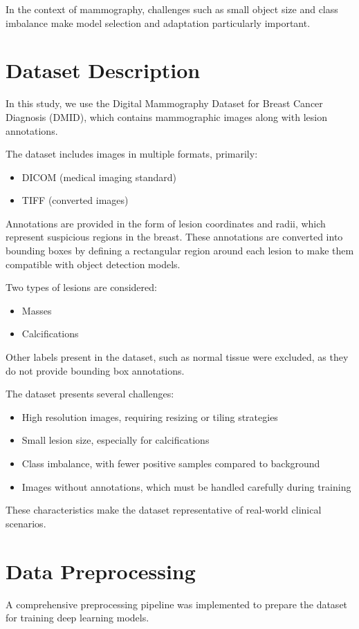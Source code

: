 \documentclass[12pt,a4paper]{article} %
\begin{document}
In the context of mammography, challenges such as small object size and class imbalance make model selection and adaptation particularly important.

\section{Dataset Description}
In this study, we use the Digital Mammography Dataset for Breast Cancer Diagnosis (DMID), which contains mammographic images along with lesion annotations.

The dataset includes images in multiple formats, primarily:
\begin{itemize}
  \item DICOM (medical imaging standard)
  \item TIFF (converted images)
\end{itemize}

Annotations are provided in the form of lesion coordinates and radii, which represent suspicious regions in the breast. These annotations are converted into bounding boxes by defining a rectangular region around each lesion to make them compatible with object detection models.

Two types of lesions are considered:
\begin{itemize}
  \item Masses
  \item Calcifications
\end{itemize}

Other labels present in the dataset, such as normal tissue were excluded, as they do not provide bounding box annotations.

The dataset presents several challenges:
\begin{itemize}
  \item High resolution images, requiring resizing or tiling strategies
  \item Small lesion size, especially for calcifications
  \item Class imbalance, with fewer positive samples compared to background
  \item Images without annotations, which must be handled carefully during training
\end{itemize}

These characteristics make the dataset representative of real-world clinical scenarios.

\section{Data Preprocessing}
A comprehensive preprocessing pipeline was implemented to prepare the dataset for training deep learning models.
\end{document}
